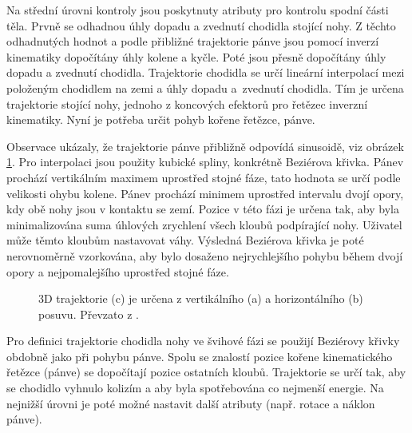 Na střední úrovni kontroly jsou poskytnuty atributy pro kontrolu spodní části těla. Prvně se odhadnou úhly dopadu a zvednutí chodidla stojící nohy. Z těchto odhadnutých hodnot a podle přibližné trajektorie pánve jsou pomocí inverzí kinematiky dopočítány úhly kolene a kyčle. Poté jsou přesně dopočítány úhly dopadu a zvednutí chodidla. Trajektorie chodidla se určí lineární interpolací mezi položeným chodidlem na zemi a úhly dopadu a~zvednutí chodidla. Tím je určena trajektorie stojící nohy, jednoho z koncových efektorů pro řetězec inverzní kinematiky. Nyní je potřeba určit pohyb kořene řetězce, pánve. 

Observace ukázaly, že trajektorie pánve přibližně odpovídá sinusoidě, viz obrázek \ref{chung_pelvis}. Pro interpolaci jsou použity kubické spliny, konkrétně Beziérova křivka. Pánev prochází vertikálním maximem uprostřed stojné fáze, tato hodnota se určí podle velikosti ohybu kolene. Pánev prochází minimem uprostřed intervalu dvojí opory, kdy obě nohy jsou v kontaktu se zemí. Pozice v této fázi je určena tak, aby byla minimalizována suma úhlových zrychlení všech kloubů podpírající nohy. Uživatel může těmto kloubům nastavovat váhy. Výsledná Beziérova křivka je poté nerovnoměrně vzorkována, aby bylo dosaženo nejrychlejšího pohybu během dvojí opory a nejpomalejšího uprostřed stojné fáze. 
\begin{figure}[h]
\begin{center}
\caption{3D trajektorie (c) je určena z vertikálního (a) a horizontálního (b) posuvu. Převzato z \cite{chung}.} \label{chung_pelvis}
\end{center}
\end{figure}
Pro definici trajektorie chodidla nohy ve švihové fázi se použijí Beziérovy křivky obdobně jako při pohybu pánve. Spolu se znalostí pozice kořene kinematického řetězce (pánve) se dopočítají pozice ostatních kloubů. Trajektorie se určí tak, aby se chodidlo vyhnulo kolizím a aby byla spotřebována co nejmenší energie. Na nejnižší úrovni je poté možné nastavit další atributy (např. rotace a náklon pánve).

